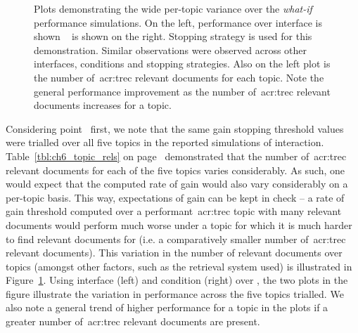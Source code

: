 \begin{figure}[t!]
    \centering
    \caption[Per-topic performance variation example]{Plots demonstrating the wide per-topic variance over the \emph{what-if} performance simulations. On the left, performance over interface  is shown \textemdash~ is shown on the right. Stopping strategy  is used for this demonstration. Similar observations were observed across other interfaces, conditions and stopping strategies. Also  on the left plot is the number of~\gls{acr:trec} relevant documents for each topic. Note the general performance improvement as the number of~\gls{acr:trec} relevant documents increases for a topic.}
    \label{fig:per_topic_differences}
\end{figure}

Considering point~ first, we note that the same gain stopping threshold values were trialled over all five topics in the reported simulations of interaction. Table~\ref{tbl:ch6_topic_rels} on page~\pageref{tbl:ch6_topic_rels} demonstrated that the number of~\gls{acr:trec} relevant documents for each of the five topics varies considerably. As such, one would expect that the computed rate of gain would also vary considerably on a per-topic basis. This way, expectations of gain can be kept in check -- a rate of gain threshold computed over a performant~\gls{acr:trec} topic with many relevant documents would perform much worse under a topic for which it is much harder to find relevant documents for (i.e. a comparatively smaller number of~\gls{acr:trec} relevant documents). This variation in the number of relevant documents over topics (amongst other factors, such as the retrieval system used) is illustrated in Figure~\ref{fig:per_topic_differences}. Using interface  (left) and condition  (right) over , the two plots in the figure illustrate the variation in performance across the five topics trialled. We also note a general trend of higher performance for a topic in the plots if a greater number of~\gls{acr:trec} relevant documents are present.

